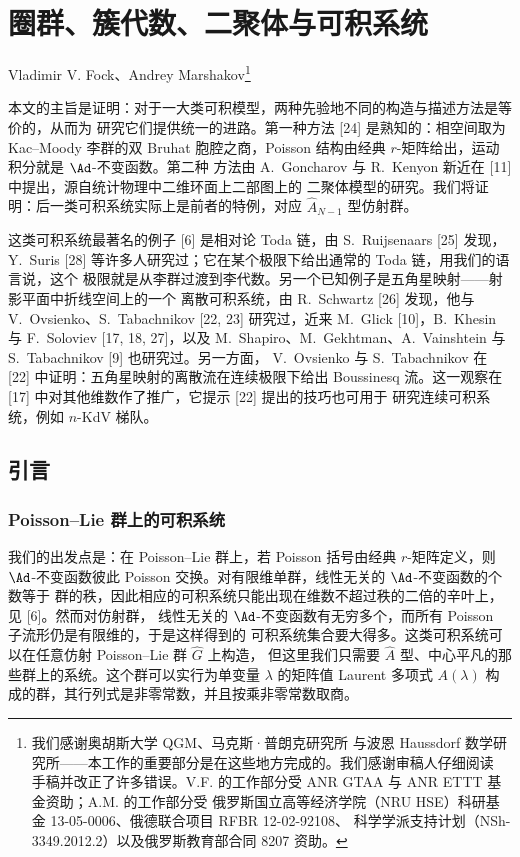 \chapter{圈群、簇代数、二聚体与可积系统}
\label{chap:01}

\noindent Vladimir V. Fock、Andrey Marshakov\footnote{我们感谢奥胡斯大学 QGM、马克斯·普朗克研究所
与波恩 Haussdorf 数学研究所——本工作的重要部分是在这些地方完成的。我们感谢审稿人仔细阅读
手稿并改正了许多错误。V.F. 的工作部分受 ANR GTAA 与 ANR ETTT 基金资助；A.M. 的工作部分受
俄罗斯国立高等经济学院（NRU HSE）科研基金 13-05-0006、俄德联合项目 RFBR 12-02-92108、
科学学派支持计划（NSh-3349.2012.2）以及俄罗斯教育部合同 8207 资助。}

本文的主旨是证明：对于一大类可积模型，两种先验地不同的构造与描述方法是等价的，从而为
研究它们提供统一的进路。第一种方法 [24] 是熟知的：相空间取为 Kac--Moody 李群的双
Bruhat 胞腔之商，Poisson 结构由经典 $r$-矩阵给出，运动积分就是 $\Ad$-不变函数。第二种
方法由 A.~Goncharov 与 R.~Kenyon 新近在 [11] 中提出，源自统计物理中二维环面上二部图上的
二聚体模型的研究。我们将证明：后一类可积系统实际上是前者的特例，对应
$\hat A_{N-1}$ 型仿射群。

这类可积系统最著名的例子 [6] 是相对论 Toda 链，由 S.~Ruijsenaars [25] 发现，
Y.~Suris [28] 等许多人研究过；它在某个极限下给出通常的 Toda 链，用我们的语言说，这个
极限就是从李群过渡到李代数。另一个已知例子是五角星映射——射影平面中折线空间上的一个
离散可积系统，由 R.~Schwartz [26] 发现，他与 V.~Ovsienko、S.~Tabachnikov [22, 23]
研究过，近来 M.~Glick [10]，B.~Khesin 与 F.~Soloviev [17, 18, 27]，以及
M.~Shapiro、M.~Gekhtman、A.~Vainshtein 与 S.~Tabachnikov [9] 也研究过。另一方面，
V.~Ovsienko 与 S.~Tabachnikov 在 [22] 中证明：五角星映射的离散流在连续极限下给出
Boussinesq 流。这一观察在 [17] 中对其他维数作了推广，它提示 [22] 提出的技巧也可用于
研究连续可积系统，例如 $n$-KdV 梯队。

\section{引言}

\subsection{Poisson--Lie 群上的可积系统}

我们的出发点是：在 Poisson--Lie 群上，若 Poisson 括号由经典 $r$-矩阵定义，则
$\Ad$-不变函数彼此 Poisson 交换。对有限维单群，线性无关的 $\Ad$-不变函数的个数等于
群的秩，因此相应的可积系统只能出现在维数不超过秩的二倍的辛叶上，见 [6]。然而对仿射群，
线性无关的 $\Ad$-不变函数有无穷多个，而所有 Poisson 子流形仍是有限维的，于是这样得到的
可积系统集合要大得多。这类可积系统可以在任意仿射 Poisson--Lie 群 $\hat G$ 上构造，
但这里我们只需要 $\hat A$ 型、中心平凡的那些群上的系统。这个群可以实行为单变量 $\lambda$
的矩阵值 Laurent 多项式 $A(\lambda)$ 构成的群，其行列式是非零常数，并且按乘非零常数取商。

